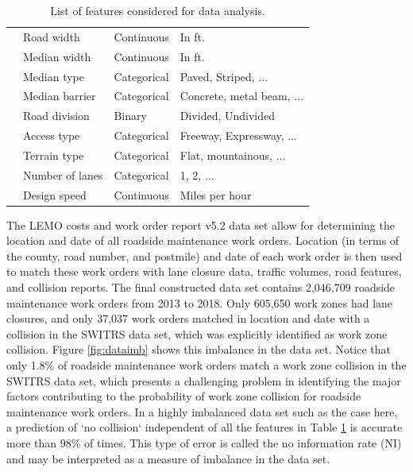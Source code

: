 \documentclass[10pt,a4paper]{article}
\begin{document}
\begin{table}[ht!]
\begin{tabular}{lllp{5cm}}
\multicolumn{1}{l|}{}                          & Road width             & Continuous  & In ft.\\
\multicolumn{1}{l|}{}                          & Median width           & Continuous  & In ft.\\
\multicolumn{1}{l|}{}                          & Median type            & Categorical & Paved, Striped, $\ldots$\\
\multicolumn{1}{l|}{}                          & Median barrier         & Categorical & Concrete, metal beam, $\ldots$\\
\multicolumn{1}{l|}{}                          & Road division          & Binary      & Divided, Undivided\\
\multicolumn{1}{l|}{}                          & Access type            & Categorical & Freeway, Expressway, $\ldots$\\
\multicolumn{1}{l|}{}                          & Terrain type           & Categorical & Flat, mountainous, $\ldots$\\
\multicolumn{1}{l|}{}                          & Number of lanes        & Categorical & 1, 2, $\ldots$\\
\multicolumn{1}{l|}{}                          & Design speed           & Continuous  & Miles per hour\\
\hline
\end{tabular}
\caption{\label{tab:features} List of features considered for data analysis.}
\end{table}

The LEMO costs and work order report v5.2 data set allow for determining the location and date of all roadside maintenance work orders. Location (in terms of the county, road number, and postmile) and date of each work order is then used to match these work orders with lane closure data, traffic volumes, road features, and collision reports. The final constructed data set contains 2,046,709 roadside maintenance work orders from 2013 to 2018. Only 605,650 work zones had lane closures, and only 37,037 work orders matched in location and date with a collision in the SWITRS data set, which was explicitly identified as work zone collision. Figure \ref{fig:dataimb} shows this imbalance in the data set. Notice that only 1.8\% of roadside maintenance work orders match a work zone collision in the SWITRS data set, which presents a challenging problem in identifying the major factors contributing to the probability of work zone collision for roadside maintenance work orders. In a highly imbalanced data set such as the case here, a prediction of `no collision` independent of all the features in Table \ref{tab:features} is accurate more than 98\% of times. This type of error is called the no information rate (NI) and may be interpreted as a measure of imbalance in the data set.
\end{document}
